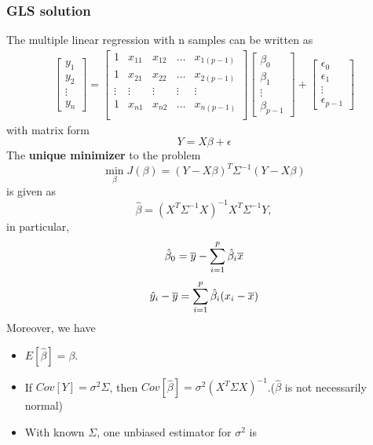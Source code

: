 \begin{refsection}
\subsubsection{GLS solution}
\begin{theorem}\label{ch:statistical-models:th:GeneralizedLeastSquareSolution}
	The multiple linear regression with n samples can be written as
	\begin{align*}
	\begin{bmatrix}
	y_1\\
	y_2\\
	\vdots\\
	y_n
	\end{bmatrix} = \begin{bmatrix}
	1 & x_{11} & x_{12} & \dots & x_{1(p-1)}\\
	1 & x_{21} & x_{22} & \dots & x_{2(p-1)}\\
	\vdots & \vdots & \vdots & \vdots & \vdots \\
	1 & x_{n1} & x_{n2} & \dots & x_{n(p-1)}\\
	\end{bmatrix}
	\begin{bmatrix}
	\beta_0\\
	\beta_1\\
	\vdots\\
	\beta_{p-1}
	\end{bmatrix}
	+ \begin{bmatrix}
	\epsilon_0\\
	\epsilon_1\\
	\vdots\\
	\epsilon_{p-1}
	\end{bmatrix}
	\end{align*}
	with matrix form
	$$Y = X\beta + \epsilon$$
	The \textbf{unique minimizer} to the problem 
	$$\min_\beta J(\beta) = (Y-X\beta)^T\Sigma^{-1}(Y - X\beta)$$
	is given as
	$$\hat{\beta} = (X^T\Sigma^{-1}X)^{-1}X^T\Sigma^{-1}Y,$$
	in particular, $$\hat{\beta}_0 = \overline{y} - \sum_{i=1}^p \hat{\beta}_i \overline{x}$$
	$$\hat{y}_i - \overline{y} =\sum_{i=1}^p \hat{\beta}_i (x_i-\overline{x}) $$
	Moreover, we have
	\begin{itemize}
		\item $E[\hat{\beta}] = \beta$.
		\item If $Cov[Y] = \sigma^2\Sigma$, then $Cov[\hat{\beta}] = \sigma^2(X^T\Sigma X)^{-1}$.($\hat{\beta}$ is not necessarily normal)
		\item With known $\Sigma$, one unbiased estimator for $\sigma^2$ is

\end{itemize}
\end{theorem}
\end{refsection}
